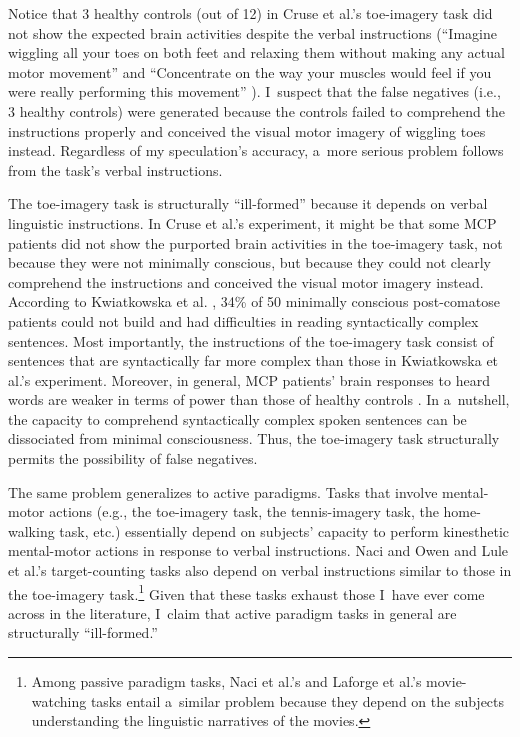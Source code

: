Notice that 3 healthy controls (out of 12) in Cruse et al.'s
\parencite*[][]{cruse_bedside_2011} %
 toe-imagery task did not show the expected brain activities despite the verbal instructions (``Imagine wiggling all your toes on both feet and relaxing them without making any actual motor movement'' and ``Concentrate on the way your muscles would feel if you were really performing this movement'' 
\parencite[][p.2098]{cruse_bedside_2011}%
). I~suspect that the false negatives (i.e., 3 healthy controls) were generated because the controls failed to comprehend the instructions properly and conceived the visual motor imagery of wiggling toes instead. Regardless of my speculation's accuracy, a~more serious problem follows from the task's verbal instructions.

The toe-imagery task is structurally ``ill-formed'' because it depends on verbal linguistic instructions. In Cruse et al.'s experiment, it might be that some MCP patients did not show the purported brain activities in the toe-imagery task, not because they were not minimally conscious, but because they could not clearly comprehend the instructions and conceived the visual motor imagery instead. According to Kwiatkowska et al.
\parencite*[][]{vassilieva_automated_2019}, %
 34\% of 50 minimally conscious post-comatose patients could not build and had difficulties in reading syntactically complex sentences. Most importantly, the instructions of the toe-imagery task consist of sentences that are syntactically far more complex than those in Kwiatkowska et al.'s experiment. Moreover, in general, MCP patients' brain responses to heard words are weaker in terms of power than those of healthy controls 
\parencite[][]{nigri_neural_2017}. %
 In a~nutshell, the capacity to comprehend syntactically complex spoken sentences can be dissociated from minimal consciousness. Thus, the toe-imagery task structurally permits the possibility of false negatives.

The same problem generalizes to active paradigms. Tasks that involve mental-motor actions (e.g., the toe-imagery task, the tennis-imagery task, the home-walking task, etc.) essentially depend on subjects' capacity to perform kinesthetic mental-motor actions in response to verbal instructions. Naci and Owen
\parencite*[][]{naci_making_2013} %
 and Lule et al.'s 
\parencite*[][]{lule_probing_2013} %
 target-counting tasks also depend on verbal instructions similar to those in the toe-imagery task.\footnote{ Among passive paradigm tasks, Naci et al.'s 
\parencite*[][]{naci_common_2014} %
 and Laforge et al.'s 
\parencite*[][]{cohen_distinguishing_2020} %
 movie-watching tasks entail a~similar problem because they depend on the subjects understanding the linguistic narratives of the movies.} Given that these tasks exhaust those I~have ever come across in the literature, I~claim that active paradigm tasks in general are structurally ``ill-formed.''

